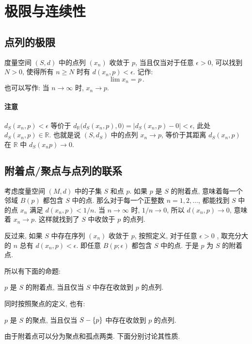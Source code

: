 \documentclass[UTF8]{ctexart}
\theoremstyle{mystyle}
\newcommand{\R}{\mathbb R}
\DeclarePairedDelimiter\set{\lbrace}{\rbrace}
\begin{document}
\section{极限与连续性}
\subsection{点列的极限}
\begin{definition}
    度量空间 $ (S, d) $ 中的点列 $ (x_n) $ 收敛于 $ p $, 当且仅当对于任意 $ \epsilon > 0 $, 可以找到 $ N > 0 $, 使得所有 $ n \geqslant N $ 时有 $ d(x_n, p) < \epsilon $. 记作: \[ \lim x_n = p \,.\]也可以写作: 当 $ n \to \infty $ 时, $ x_n \to p $.
\end{definition}

\paragraph{注意}
$ d_S (x_n, p) < \epsilon $ 等价于 $ d_\R \big( d_S(x_n, p), 0 \big) = |d_S(x_n, p)- 0| < \epsilon $, 此处 $ d_S(x_n, p) \in \R $. 也就是说 $ (S, d_S) $ 中的点列 $ x_n \to p $, 等价于其距离 $ d_S(x_n, p) $ 在 $ \R $ 中 $ d_S(x_n p) \to 0 $.

\subsection{附着点/聚点与点列的联系}
考虑度量空间 $ (M, d) $ 中的子集 $ S $ 和点 $ p $. 如果 $ p $ 是 $ S $ 的附着点, 意味着每一个邻域 $ B(p) $ 都包含 $ S $ 中的点. 那么对于每一个正整数 $ n = 1, 2, \dots $, 都能找到 $ S $ 中的点 $ x_n $ 满足 $ d(x_n, p) < 1 / n $. 当 $ n \to \infty $ 时, $ 1/n \to 0 $, 所以 $ d(x_n, p) \to 0 $, 意味着 $ x_n \to p $. 这样就找到了 $ S $ 中收敛于 $ p $ 的点列.

反过来, 如果 $ S $ 中存在序列 $ (x_n) $ 收敛于 $ p $, 按照定义, 对于任意 $ \epsilon > 0 $ , 取充分大的 $ n $ 总有 $ d(x_n, p) < \epsilon $. 即任意 $ B(p; \epsilon) $ 都包含 $ S $ 中的点. 于是 $ p $ 为 $ S $ 的附着点.

所以有下面的命题:
\begin{proposition}
    $ p $ 是 $ S $ 的附着点, 当且仅当 $ S $ 中存在收敛到 $ p $ 的点列. 
\end{proposition}

同时按照聚点的定义, 也有:
\begin{proposition}
    $ p $ 是 $ S $ 的聚点, 当且仅当 $ S - \set{p} $ 中存在收敛到 $ p $ 的点列.
\end{proposition}

由于附着点可以分为聚点和孤点两类. 下面分别讨论其性质.
\end{document}
